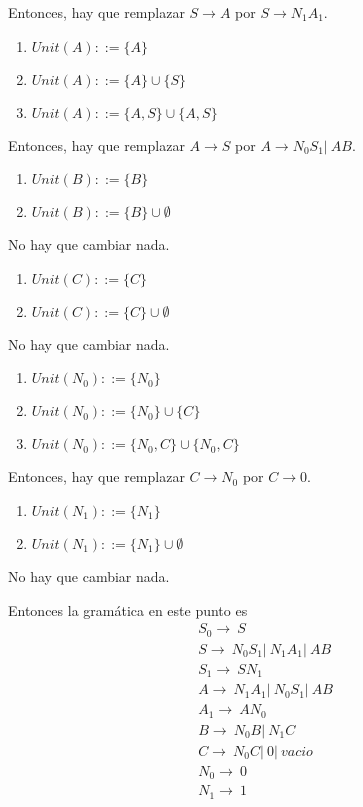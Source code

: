 \documentclass{article}
\begin{document}
\begin{enumerate}
\begin{enumerate}
        Entonces, hay que remplazar $S \rightarrow A$ por $S \rightarrow N_1A_1$.

        \begin{enumerate}
            \item $Unit(A) ::= \{A\}$
            \item $Unit(A) ::= \{A\} \cup \{S\}$
            \item $Unit(A) ::= \{A, S\} \cup \{A, S\}$
        \end{enumerate}

        Entonces, hay que remplazar $A \rightarrow S$ por $A \rightarrow N_0S_1| \ AB$.

        \begin{enumerate}
            \item $Unit(B) ::= \{B\}$
            \item $Unit(B) ::= \{B\} \cup \emptyset$
        \end{enumerate}
        No hay que cambiar nada.

        \begin{enumerate}
            \item $Unit(C) ::= \{C\}$
            \item $Unit(C) ::= \{C\} \cup \emptyset$
        \end{enumerate}
        No hay que cambiar nada.

        \begin{enumerate}
            \item $Unit(N_0) ::= \{N_0\}$
            \item $Unit(N_0) ::= \{N_0\} \cup \{C\}$
            \item $Unit(N_0) ::= \{N_0, C\} \cup \{N_0, C\}$
        \end{enumerate}
        Entonces, hay que remplazar $C \rightarrow N_0$ por $C \rightarrow 0$.

        \begin{enumerate}
            \item $Unit(N_1) ::= \{N_1\}$
            \item $Unit(N_1) ::= \{N_1\} \cup \emptyset$
        \end{enumerate}
        No hay que cambiar nada.

        Entonces la gramática en este punto es 
        \begin{align*}
            &S_0 \rightarrow \ S \\
            &S \rightarrow \ N_0S_1 |\ N_1A_1 |\ AB \\
            &S_1 \rightarrow \ SN_1 \\
            &A \rightarrow \ N_1A_1 |\ N_0S_1| \ AB \\
            &A_1 \rightarrow \ AN_0 \\
            &B \rightarrow \ N_0B |\ N_1C \\
            &C \rightarrow \ N_0C |\ 0 |\ vacio \\
            &N_0 \rightarrow \ 0 \\
            &N_1 \rightarrow \ 1
        \end{align*}
    \end{enumerate}
\end{enumerate}
\end{document}
